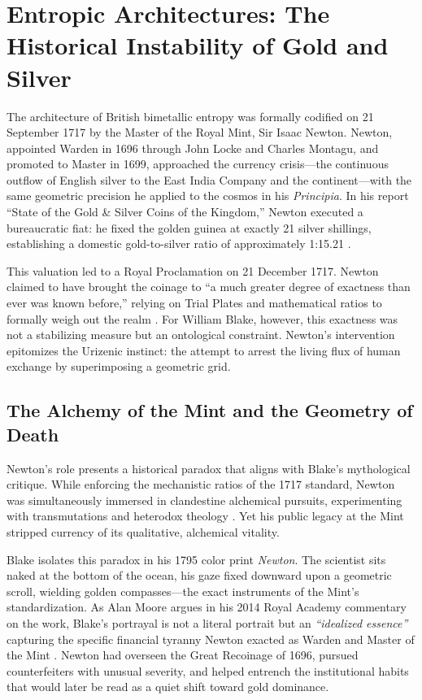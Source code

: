 \documentclass[
]{article}
\begin{document}
\newpage

\section{Entropic Architectures: The Historical Instability of Gold and
Silver}\label{entropic-architectures-the-historical-instability-of-gold-and-silver}

The architecture of British bimetallic entropy was formally codified on
21 September 1717 by the Master of the Royal Mint, Sir Isaac Newton.
Newton, appointed Warden in 1696 through John Locke and Charles Montagu,
and promoted to Master in 1699, approached the currency crisis---the
continuous outflow of English silver to the East India Company and the
continent---with the same geometric precision he applied to the cosmos
in his \emph{Principia}. In his report ``State of the Gold \& Silver
Coins of the Kingdom,'' Newton executed a bureaucratic fiat: he fixed
the golden guinea at exactly 21 silver shillings, establishing a
domestic gold-to-silver ratio of approximately 1:15.21
\citep{quinn1996competing}.

This valuation led to a Royal Proclamation on 21 December 1717. Newton
claimed to have brought the coinage to ``a much greater degree of
exactness than ever was known before,'' relying on Trial Plates and
mathematical ratios to formally weigh out the realm
\citep{horsefield1960british}. For William Blake, however, this
exactness was not a stabilizing measure but an ontological constraint.
Newton's intervention epitomizes the Urizenic instinct: the attempt to
arrest the living flux of human exchange by superimposing a geometric
grid.

\subsection{The Alchemy of the Mint and the Geometry of
Death}\label{the-alchemy-of-the-mint-and-the-geometry-of-death}

Newton's role presents a historical paradox that aligns with Blake's
mythological critique. While enforcing the mechanistic ratios of the
1717 standard, Newton was simultaneously immersed in clandestine
alchemical pursuits, experimenting with transmutations and heterodox
theology \citep{schouten2021lucretius}. Yet his public legacy at the
Mint stripped currency of its qualitative, alchemical vitality.

Blake isolates this paradox in his 1795 color print \emph{Newton}. The
scientist sits naked at the bottom of the ocean, his gaze fixed downward
upon a geometric scroll, wielding golden compasses---the exact
instruments of the Mint's standardization. As Alan Moore argues in his
2014 Royal Academy commentary on the work, Blake's portrayal is not a
literal portrait but an \emph{``idealized essence''} capturing the
specific financial tyranny Newton exacted as Warden and Master of the
Mint \citep{moore2014blake}. Newton had overseen the Great Recoinage of
1696, pursued counterfeiters with unusual severity, and helped entrench
the institutional habits that would later be read as a quiet shift
toward gold dominance.
\end{document}
